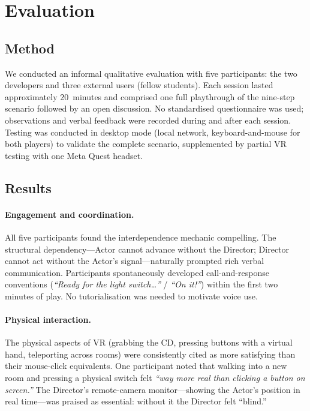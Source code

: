 \documentclass[12pt,a4paper]{article}
\begin{document}
\section{Evaluation}
\label{sec:eval}

\subsection{Method}
We conducted an informal qualitative evaluation with five participants: the two developers and three external users (fellow students). Each session lasted approximately 20~minutes and comprised one full playthrough of the nine-step scenario followed by an open discussion. No standardised questionnaire was used; observations and verbal feedback were recorded during and after each session. Testing was conducted in desktop mode (local network, keyboard-and-mouse for both players) to validate the complete scenario, supplemented by partial VR testing with one Meta Quest headset.

\subsection{Results}

\paragraph{Engagement and coordination.}
All five participants found the interdependence mechanic compelling. The structural dependency---Actor cannot advance without the Director; Director cannot act without the Actor's signal---naturally prompted rich verbal communication. Participants spontaneously developed call-and-response conventions (\textit{``Ready for the light switch\ldots''} / \textit{``On it!''}) within the first two minutes of play. No tutorialisation was needed to motivate voice use.

\paragraph{Physical interaction.}
The physical aspects of VR (grabbing the CD, pressing buttons with a virtual hand, teleporting across rooms) were consistently cited as more satisfying than their mouse-click equivalents. One participant noted that walking into a new room and pressing a physical switch felt \textit{``way more real than clicking a button on screen.''} The Director's remote-camera monitor---showing the Actor's position in real time---was praised as essential: without it the Director felt ``blind.''
\end{document}
